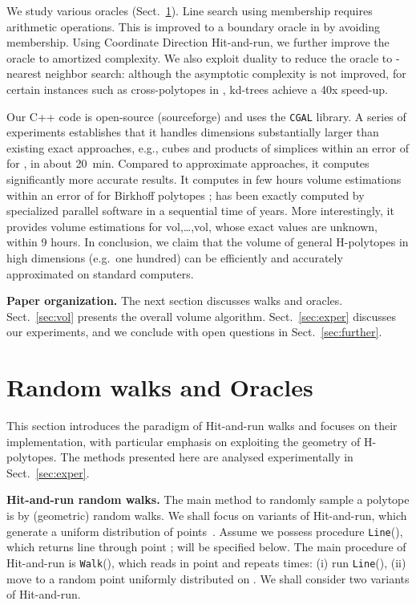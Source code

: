 \documentclass[11pt,a4paper]{article}
\def\vol{\mbox{vol}}
\def\Line{{\tt Line}}
\def\Walk{{\tt Walk}}
\def\vol{\mbox{vol}}
\begin{document}
We study various oracles (Sect.~\ref{sec:OraclSampl}). 
Line search using membership requires
 arithmetic operations.
This is improved to a boundary oracle in  by avoiding membership. 
Using Coordinate Direction Hit-and-run, we further improve 
the oracle to  amortized complexity.
We also exploit duality to reduce the oracle to
-nearest neighbor search:
although the asymptotic complexity is not improved,
for certain instances such as cross-polytopes in ,
kd-trees achieve a 40x speed-up. 

Our C++ code is
open-source (sourceforge) and uses the {\tt CGAL} library. A series of experiments establishes that
it handles dimensions substantially larger than existing exact approaches,
e.g., cubes and products of simplices
within an error of  for , in about 20~min.
Compared to approximate approaches, it computes significantly
more accurate results.
It computes in few hours volume estimations within an error of  for Birkhoff polytopes ;  has been exactly computed by specialized parallel software in a sequential time of years.   
More interestingly, it provides volume estimations for \vol,\dots,\vol, whose exact values are unknown, within 9 hours.  
In conclusion, we claim that the volume of general H-polytopes
in high dimensions (e.g.\ one hundred) can be efficiently and accurately
approximated on standard computers.  

\textbf{Paper organization.}
The next section discusses walks and oracles.
Sect.~\ref{sec:vol} presents the overall volume algorithm.  
Sect.~\ref{sec:exper} discusses our experiments, and we conclude
with open questions in Sect.~\ref{sec:further}.

\section{Random walks and Oracles} \label{sec:OraclSampl}
This section introduces the paradigm of Hit-and-run walks and focuses on
their implementation, with particular emphasis on exploiting the geometry
of H-polytopes. The methods presented here are analysed experimentally in Sect.~\ref{sec:exper}.

\textbf{Hit-and-run random walks.} 
The main method to randomly sample a polytope is
by (geometric) random walks.
We shall focus on variants of Hit-and-run, which generate a uniform
distribution of points~\cite{smith1984montecarlo}. Assume we possess procedure \Line(), which returns line  through
point ;  will be specified below.
The main procedure of Hit-and-run is \Walk(), which reads in point
 and repeats  times:
(i) run \Line(), 
(ii) move  to a random point uniformly distributed on .
We shall consider two variants of Hit-and-run.
\end{document}
